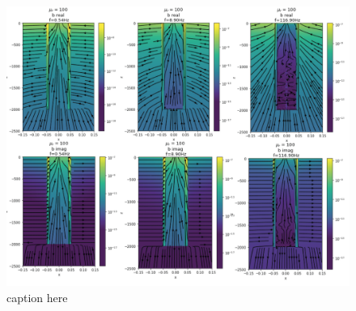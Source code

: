 \begin{figure}[htb]
    \begin{center}
    \includegraphics[width=\columnwidth]{figures/magnetic_flux_density_mu.png}
    \end{center}
\caption{caption here}
\label{fig:magnetic_flux_density_mu}
\end{figure}
